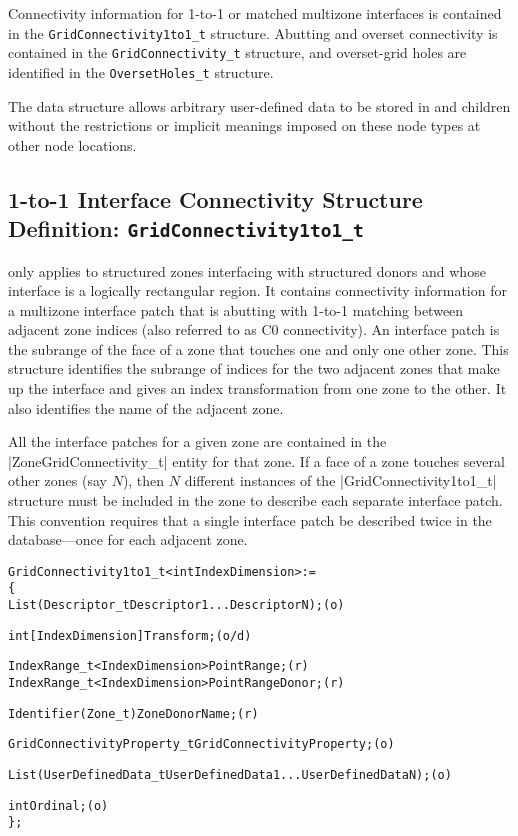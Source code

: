 Connectivity information for 1-to-1 or matched multizone interfaces is
contained in the \texttt{GridConnectivity1to1\_t} structure.
Abutting and overset connectivity is contained in the
\texttt{GridConnectivity\_t} structure, and overset-grid holes are
identified in the \texttt{OversetHoles\_t} structure.

The  data structure allows arbitrary
user-defined data to be stored in  and
 children without the restrictions or implicit
meanings imposed on these node types at other node locations.

\subsection{1-to-1 Interface Connectivity Structure Definition: \texttt{GridConnectivity1to1\_t}}
\label{s:GridConnectivity1to1}

 only applies to structured zones
interfacing with structured donors and whose interface is a logically
rectangular region.
It contains connectivity information for a multizone interface patch
that is abutting with 1-to-1 matching between adjacent zone indices
(also referred to as C0 connectivity).
An interface patch is the subrange of the face of a zone that touches
one and only one other zone.
This structure identifies the subrange of indices for the two adjacent
zones that make up the interface and gives an index transformation from
one zone to the other.
It also identifies the name of the adjacent zone.

All the interface patches for a given zone are contained in the
|ZoneGridConnectivity_t| entity for that zone.
If a face of a zone touches several other zones (say $N$), then $N$
different instances of the |GridConnectivity1to1_t| structure must be
included in the zone to describe each separate interface patch.
This convention requires that a single interface patch be described
twice in the database---once for each adjacent zone.

\begin{alltt}
  GridConnectivity1to1\_t< int IndexDimension > :=
    \{
    List( Descriptor\_t Descriptor1 ... DescriptorN ) ;                      (o)

    int[IndexDimension] Transform ;                                         (o/d)

    IndexRange\_t<IndexDimension> PointRange ;                               (r)
    IndexRange\_t<IndexDimension> PointRangeDonor ;                          (r)

    Identifier(Zone\_t) ZoneDonorName ;                                      (r)

    GridConnectivityProperty\_t GridConnectivityProperty ;                   (o)

    List( UserDefinedData\_t UserDefinedData1 ... UserDefinedDataN ) ;       (o)

    int Ordinal ;                                                           (o)
    \} ;
\end{alltt}

